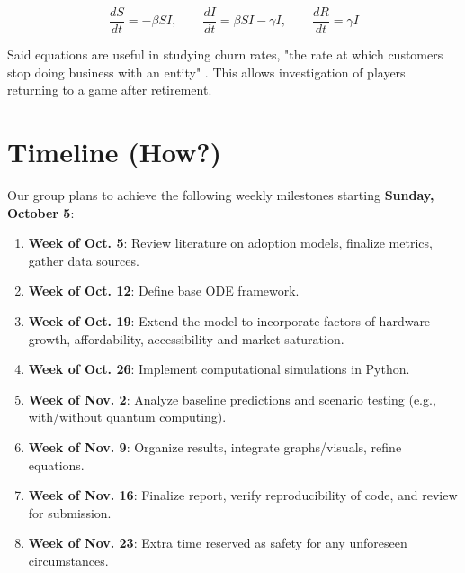 \documentclass{article}
\begin{document}
\begin{equation}
\frac{dS}{dt} = -\beta S I, 
\qquad \frac{dI}{dt} = \beta S I - \gamma I, 
\qquad \frac{dR}{dt} = \gamma I
\end{equation}

\noindent Said equations are useful in studying churn rates, "the rate at which customers stop doing business with an entity" \cite{INVESTOPEDIA2025CHURN}. This allows investigation of players returning to a game after retirement. 



\section{Timeline (How?)}
Our group plans to achieve the following weekly milestones starting \textbf{Sunday, October 5}: \\

\begin{enumerate}[nosep]
    \item \textbf{Week of Oct. 5}: Review literature on adoption models, finalize metrics, gather data sources.
    \item \textbf{Week of Oct. 12}: Define base ODE framework.
    \item \textbf{Week of Oct. 19}: Extend the model to incorporate factors of hardware growth, affordability, accessibility and market saturation.
    \item \textbf{Week of Oct. 26}: Implement computational simulations in Python. 
    \item \textbf{Week of Nov. 2}: Analyze baseline predictions and scenario testing (e.g., with/without quantum computing).
    \item \textbf{Week of Nov. 9}: Organize results, integrate graphs/visuals, refine equations.
    \item \textbf{Week of Nov. 16}: Finalize report, verify reproducibility of code, and review for submission.
    \item \textbf{Week of Nov. 23}: Extra time reserved as safety for any unforeseen circumstances.

\end{enumerate}
\end{document}
